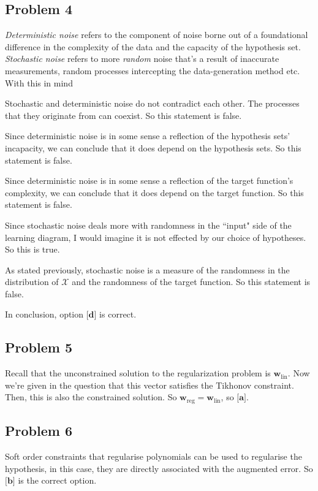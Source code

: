 \documentclass{article}
\begin{document}
\subsection*{Problem 4}
\emph{Deterministic noise} refers to the component of noise borne out of a foundational difference in the complexity of the data and the capacity of the hypothesis set. \emph{Stochastic noise} refers to more \emph{random} noise that's a result of inaccurate measurements, random processes intercepting the data-generation method etc. With this in mind
\begin{enumerate}[label = \textbf{[\alph*]}]
    \item Stochastic and deterministic noise do not contradict each other. The processes that they originate from can coexist. So this statement is false.
    \item Since deterministic noise is in some sense a reflection of the hypothesis sets' incapacity, we can conclude that it does depend on the hypothesis sets. So this statement is false.
    \item Since deterministic noise is in some sense a reflection of the target function's complexity, we can conclude that it does depend on the target function. So this statement is false.
    \item Since stochastic noise deals more with randomness in the ``input" side of the learning diagram, I would imagine it is not effected by our choice of hypotheses. So this is true.
    \item As stated previously, stochastic noise is a measure of the randomness in the distribution of $\mathcal{X}$ and the randomness of the target function. So this statement is false.
\end{enumerate}
In conclusion, option $\textbf{[d]}$ is correct.
\subsection*{Problem 5}
Recall that the unconstrained solution to the regularization problem is $\mathbf{w}_{\text{lin}}$. Now we're given in the question that this vector satisfies the Tikhonov constraint. Then, this is also the constrained solution. So $\mathbf{w}_{\text{reg}} = \mathbf{w}_{\text{lin}}$, so $\textbf{[a]}$.
\subsection*{Problem 6}
Soft order constraints that regularise polynomials can be used to regularise the hypothesis, in this case, they are directly associated with the augmented error. So $\textbf{[b]}$ is the correct option.
\newpage
\end{document}
